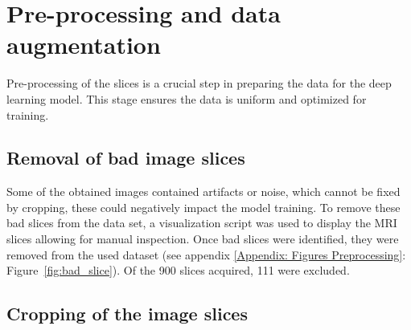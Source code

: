 \documentclass[twocolumn]{article}
\begin{document}
\begin{table}[h]
\centering
{}
\caption{\label{tab:mri} Overview of the scan and image parameters used to acquire high- and low-resolution data of mice.}
\end{table}


\section{Pre-processing and data augmentation}

Pre-processing of the slices is a crucial step in preparing the data for the deep learning model. 
This stage ensures the data is uniform and optimized for training. 

\subsection{Removal of bad image slices}

Some of the obtained images contained artifacts or noise, which cannot be fixed by cropping, these could negatively impact the model training. 
To remove these bad slices from the data set, a visualization script was used to display the MRI slices allowing for manual inspection. 
Once bad slices were identified, they were removed from the used dataset (see appendix \ref{Appendix: Figures Preprocessing}: Figure~\ref{fig:bad_slice}). Of the 900 slices acquired, 111 were excluded.

\subsection{Cropping of the image slices}
\end{document}
